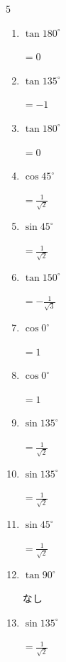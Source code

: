 \begin{multicols}{5}
\begin{enumerate}
  \item $\displaystyle \tan{180^\circ}$

        $\displaystyle =0$

  \item $\displaystyle \tan{135^\circ}$

        $\displaystyle =-1$

  \item $\displaystyle \tan{180^\circ}$

        $\displaystyle =0$

\columnbreak %

\resetques

  \item $\displaystyle \cos{45^\circ}$

        $\displaystyle =\frac{1}{\sqrt{2}}$

  \item $\displaystyle \sin{45^\circ}$

        $\displaystyle =\frac{1}{\sqrt{2}}$

  \item $\displaystyle \tan{150^\circ}$

        $\displaystyle =-\frac{1}{\sqrt{3}}$

  \item $\displaystyle \cos{0^\circ}$

        $\displaystyle =1$

  \item $\displaystyle \cos{0^\circ}$

        $\displaystyle =1$

  \item $\displaystyle \sin{135^\circ}$

        $\displaystyle =\frac{1}{\sqrt{2}}$

  \item $\displaystyle \sin{135^\circ}$

        $\displaystyle =\frac{1}{\sqrt{2}}$

  \item $\displaystyle \sin{45^\circ}$

        $\displaystyle =\frac{1}{\sqrt{2}}$

  \item $\displaystyle \tan{90^\circ}$

        $\displaystyle なし$

  \item $\displaystyle \sin{135^\circ}$

        $\displaystyle =\frac{1}{\sqrt{2}}$


\end{enumerate}
\end{multicols}
